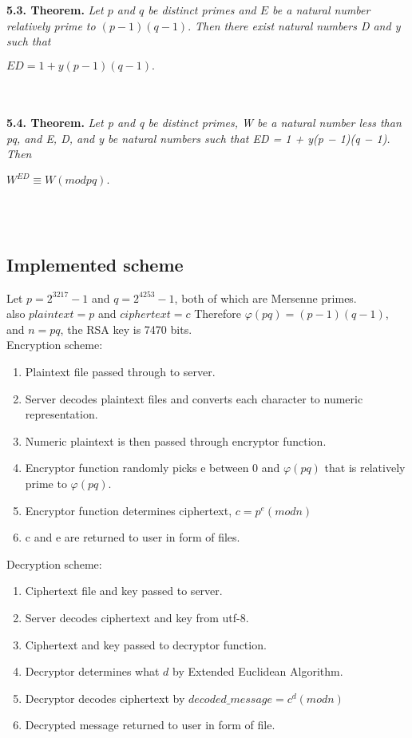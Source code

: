 \documentclass[a4paper]{article}
\begin{document}
\textbf{5.3. Theorem.} \textit{Let $p$ and $q$ be distinct primes and $E$ be a natural number relatively prime
to  $(p − 1)(q − 1).$ Then there exist natural numbers D and y such that} \\
\begin{center} $ED = 1 + y(p − 1)(q − 1).$
\end{center}
~\\ ~\\ 

\textbf{5.4. Theorem.} \textit{Let p and q be distinct primes, W be a natural number less than pq, and
E, D, and y be natural numbers such that ED = 1 + y(p − 1)(q − 1). Then}
\begin{center}$W^{ED} ≡ W(mod pq).$
\end{center}
~\\ ~\\ 

\subsection{Implemented scheme}

Let $p = 2^{3217}-1$ and $q = 2^{4253}-1$, both of which are Mersenne primes. \\
also $plaintext = p$ and $ciphertext = c$\newline
Therefore $\varphi(pq) = (p-1)(q-1)$, and $n = pq$, the RSA key is 7470 bits.\\
Encryption scheme:
\begin{enumerate}
\item Plaintext file passed through to server.
\item Server decodes plaintext files and converts each character to numeric representation.
\item Numeric plaintext is then passed through encryptor function. 
\item Encryptor function randomly picks e between 0 and $\varphi(pq)$ that is relatively prime to  $\varphi(pq)$. 
\item Encryptor function determines ciphertext, $c = p^e(mod n)$ 
\item c and e are returned to user in form of files.
\end{enumerate}
Decryption scheme:
\begin{enumerate}
\item Ciphertext file and key passed to server.
\item Server decodes ciphertext and key from utf-8.
\item Ciphertext and key passed to decryptor function.
\item Decryptor determines what $d$ by Extended Euclidean Algorithm.
\item Decryptor decodes ciphertext by $decoded\_message = c^d(modn)$
\item Decrypted message returned to user in form of file.
\end{enumerate}
\end{document}
